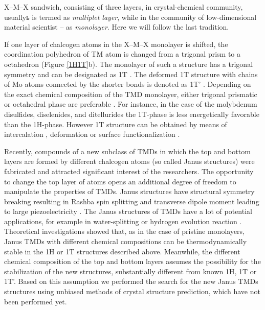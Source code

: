 \documentclass[a4paperm]{article}
\begin{document}
X--M--X sandwich, consisting of three layers, in crystal-chemical community, usuallyь is termed as {\it multiplet layer}, while in the community of low-dimensional material scientist -- as {\it monolayer}.
Here we will follow the last tradition. 


If one layer of chalcogen atoms in the X--M--X monolayer is shifted, the coordination polyhedron of TM atom is changed from a trigonal prism to a octahedron (Figure \ref{1H1T}b). 
The monolayer of such a structure has a trigonal symmetry and can be designated as 1T \cite{huang2020recent}. 
The deformed 1T structure with chains of Mo atoms connected by the shorter bonds is denoted as 1T' \cite{huang2020recent}.
Depending on the exact chemical composition of the TMD monolayer, either trigonal prismatic or octahedral phase are preferable \cite{ataca2012stable}.
For instance, in the case of the molybdenum disulfides, diselenides, and ditellurides the 1T-phase is less energetically favorable than the 1H-phase. However 1T structure can be obtained by means of intercalation \cite{kan2014structures, wang2014atomic}, deformation \cite{duerloo2014structural} or surface functionalization \cite{tang2015stabilization, voiry2015covalent}. 

Recently, compounds of a new subclass of TMDs in which the top and bottom layers are formed by different chalcogen atoms (so called Janus structures) were fabricated and attracted significant interest \cite{lu2017, zhang2017janus} of the researchers. 
The opportunity to change the top layer of atoms opens an additional degree of freedom to manipulate the properties of TMDs. 
Janus structures have structural symmetry breaking \cite{li2017electronic, van2020first} resulting in Rashba spin splitting \cite{hu2018intrinsic} and transverse dipole moment leading to large piezoelectricity \cite{dong2017large, li2018recent}. 
The Janus structures of TMDs have a lot of potential applications, for example in water-splitting \cite{xia2018universality, ma2018janus} or hydrogen evolution reaction \cite{er2018prediction, zhou2019janus}. 
Theoretical investigations showed that, as in the case of pristine monolayers, Janus TMDs with different chemical compositions can be thermodynamically stable in the 1H or 1T structures described above.
Meanwhile, the different chemical composition of the top and bottom layers assumes the possibility for the stabilization of the new structures, substantially different from known 1H, 1T or 1T'.
Based on this assumption we performed the search for the new Janus TMDs structures using unbiased methods of crystal structure prediction, which have not been performed yet.
\end{document}
